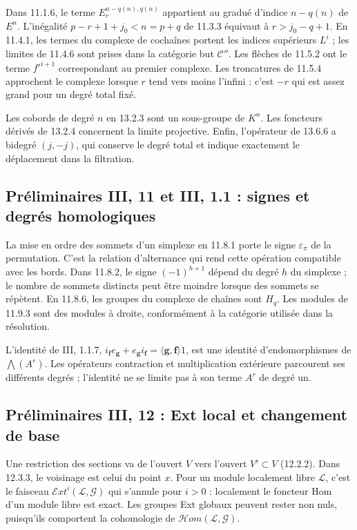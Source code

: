 \documentclass[11pt,a4paper]{article}
\begin{document}
Dans 11.1.6, le terme $E_r^{n-q(n),q(n)}$ appartient au gradué
d'indice $n-q(n)$ de $E^n$. L'inégalité
$p-r+1+j_0<n=p+q$ de 11.3.3 équivaut à $r>j_0-q+1$.
En 11.4.1, les termes du complexe de cochaînes portent les
indices supérieurs $L^i$ ; les limites de 11.4.6 sont prises
dans la catégorie but $\mathcal C''$.
Les flèches de 11.5.2 ont le terme $f'^{i+1}$ correspondant
au premier complexe. Les troncatures de 11.5.4 approchent le
complexe lorsque $r$ tend vers moins l'infini : c'est
$-r$ qui est assez grand pour un degré total fixé.

Les cobords de degré $n$ en 13.2.3 sont un sous-groupe de
$K^n$. Les foncteurs dérivés de 13.2.4 concernent la limite
projective. Enfin, l'opérateur de 13.6.6 a bidegré $(j,-j)$,
qui conserve le degré total et indique exactement le déplacement
dans la filtration.

\subsection{Préliminaires III, 11 et III, 1.1 : signes et degrés homologiques}
\label{note:base3-signs}
La mise en ordre des sommets d'un simplexe en 11.8.1 porte le
signe $\varepsilon_\pi$ de la permutation. C'est la relation
d'alternance qui rend cette opération compatible avec les bords.
Dans 11.8.2, le signe $(-1)^{h+1}$ dépend du degré $h$ du
simplexe ; le nombre de sommets distincts peut être moindre
lorsque des sommets se répètent. En 11.8.6, les groupes du
complexe de chaînes sont $H_q$. Les modules de 11.9.3 sont
des modules à droite, conformément à la catégorie utilisée
dans la résolution.

L'identité de III, 1.1.7,
$i_{\mathbf f}e_{\mathbf g}+e_{\mathbf g}i_{\mathbf f}
=\langle\mathbf g,\mathbf f\rangle1$, est une identité
d'endomorphismes de $\bigwedge(A^r)$. Les opérateurs contraction
et multiplication extérieure parcourent ses différents degrés ;
l'identité ne se limite pas à son terme $A^r$ de degré un.

\subsection{Préliminaires III, 12 : Ext local et changement de base}
\label{note:base3-ext}
Une restriction des sections va de l'ouvert $V$ vers l'ouvert
$V'\subset V$ (12.2.2). Dans 12.3.3, le voisinage est celui du
point $x$. Pour un module localement libre $\mathcal L$, c'est
le faisceau $\mathcal E\!xt^i(\mathcal L,\mathcal G)$ qui
s'annule pour $i>0$ : localement le foncteur Hom d'un module
libre est exact. Les groupes Ext globaux peuvent rester non
nuls, puisqu'ils comportent la cohomologie de
$\mathcal H\!om(\mathcal L,\mathcal G)$.
\end{document}
